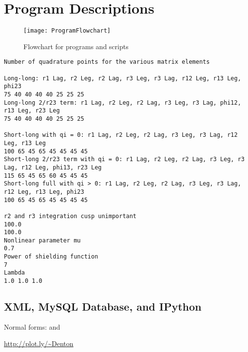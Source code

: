 \documentclass[Dissertation.tex]{subfiles}
\begin{document}
\chapter{Program Descriptions}
\label{chp:Programs}


\begin{figure}
	\centering
	\texttt{[image: ProgramFlowchart]}
	\caption{Flowchart for programs and scripts}
	\label{fig:ProgramFlowchart}
\end{figure}


{
\singlespacing

\begin{lstlisting}[caption=Set of integration points in m07n7.txt]
Number of quadrature points for the various matrix elements

Long-long: r1 Lag, r2 Leg, r2 Lag, r3 Leg, r3 Lag, r12 Leg, r13 Leg, phi23
75 40 40 40 40 25 25 25
Long-long 2/r23 term: r1 Lag, r2 Leg, r2 Lag, r3 Leg, r3 Lag, phi12, r13 Leg, r23 Leg
75 40 40 40 40 25 25 25

Short-long with qi = 0: r1 Lag, r2 Leg, r2 Lag, r3 Leg, r3 Lag, r12 Leg, r13 Leg
100 65 45 65 45 45 45 45
Short-long 2/r23 term with qi = 0: r1 Lag, r2 Leg, r2 Lag, r3 Leg, r3 Lag, r12 Leg, phi13, r23 Leg
115 65 45 65 60 45 45 45
Short-long full with qi > 0: r1 Lag, r2 Leg, r2 Lag, r3 Leg, r3 Lag, r12 Leg, r13 Leg, phi23
100 65 45 65 45 45 45 45

r2 and r3 integration cusp unimportant
100.0
100.0
Nonlinear parameter mu
0.7
Power of shielding function
7
Lambda
1.0 1.0 1.0
\end{lstlisting}

}



\section{XML, MySQL Database, and IPython}
\label{sec:XMLSQLIPy}


Normal forms:
\cite{Phlonx} and \cite{Kent1983}


\url{http://plot.ly/~Denton}
\end{document}
